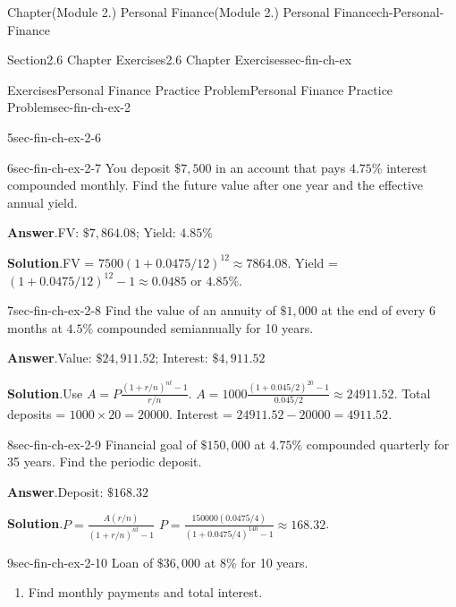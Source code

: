 \documentclass[oneside,10pt,]{book}
\newcommand{\blocktitlefont}{\relax}
\begin{document}
\begin{chapterptx}{Chapter}{(Module 2.) Personal Finance}{}{(Module 2.) Personal Finance}{}{}{ch-Personal-Finance}
\begin{sectionptx}{Section}{2.6 Chapter Exercises}{}{2.6 Chapter Exercises}{}{}{sec-fin-ch-ex}
\begin{exercises-subsection-numberless}{Exercises}{Personal Finance Practice Problem}{}{Personal Finance Practice Problem}{}{}{sec-fin-ch-ex-2}
\begin{divisionexercise}{5}{}{}{sec-fin-ch-ex-2-6}
\end{divisionexercise}%
\begin{divisionexercise}{6}{}{}{sec-fin-ch-ex-2-7}%
You deposit \(\$7,500\) in an account that pays \(4.75\%\) interest compounded monthly. Find the future value after one year and the effective annual yield.%
\par\smallskip%
\noindent\textbf{\blocktitlefont Answer}.\hypertarget{sec-fin-ch-ex-2-7-2}{}\quad{}FV: \(\$7,864.08\); Yield: \(4.85\%\)%
\par\smallskip%
\noindent\textbf{\blocktitlefont Solution}.\hypertarget{sec-fin-ch-ex-2-7-3}{}\quad{}FV = \(7500(1 + 0.0475/12)^{12} \approx 7864.08\). Yield = \((1 + 0.0475/12)^{12} - 1 \approx 0.0485\) or \(4.85\%\).%
\end{divisionexercise}%
\begin{divisionexercise}{7}{}{}{sec-fin-ch-ex-2-8}%
Find the value of an annuity of \(\$1,000\) at the end of every 6 months at \(4.5\%\) compounded semiannually for 10 years.%
\par\smallskip%
\noindent\textbf{\blocktitlefont Answer}.\hypertarget{sec-fin-ch-ex-2-8-2}{}\quad{}Value: \(\$24,911.52\); Interest: \(\$4,911.52\)%
\par\smallskip%
\noindent\textbf{\blocktitlefont Solution}.\hypertarget{sec-fin-ch-ex-2-8-3}{}\quad{}Use \(A = P \frac{(1+r/n)^{nt}-1}{r/n}\). \(A = 1000 \frac{(1+0.045/2)^{20}-1}{0.045/2} \approx 24911.52\). Total deposits = \(1000 \times 20 = 20000\). Interest = \(24911.52 - 20000 = 4911.52\).%
\end{divisionexercise}%
\begin{divisionexercise}{8}{}{}{sec-fin-ch-ex-2-9}%
Financial goal of \(\$150,000\) at \(4.75\%\) compounded quarterly for 35 years. Find the periodic deposit.%
\par\smallskip%
\noindent\textbf{\blocktitlefont Answer}.\hypertarget{sec-fin-ch-ex-2-9-2}{}\quad{}Deposit: \(\$168.32\)%
\par\smallskip%
\noindent\textbf{\blocktitlefont Solution}.\hypertarget{sec-fin-ch-ex-2-9-3}{}\quad{}\(P = \frac{A(r/n)}{(1+r/n)^{nt}-1}\) \(P = \frac{150000(0.0475/4)}{(1+0.0475/4)^{140}-1} \approx 168.32\).%
\end{divisionexercise}%
\begin{divisionexercise}{9}{}{}{sec-fin-ch-ex-2-10}%
Loan of \(\$36,000\) at \(8\%\) for 10 years.%
\begin{enumerate}[label={\alph*}]
\item{}Find monthly payments and total interest.%

\end{enumerate}
\end{divisionexercise}
\end{exercises-subsection-numberless}
\end{sectionptx}
\end{chapterptx}
\end{document}
